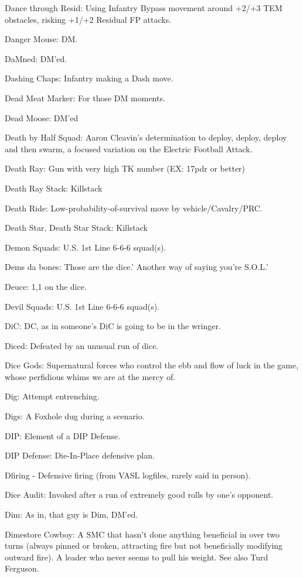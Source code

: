 \documentclass[letterpaper]{article}
\begin{document}
Dance through Resid: Using Infantry Bypass movement around +2/+3 TEM obstacles, risking +1/+2 Residual FP attacks.

Danger Mouse: DM.

DaMned: DM'ed.

Dashing Chaps: Infantry making a Dash move.

Dead Meat Marker: For those DM moments.

Dead Moose: DM'ed

Death by Half Squad: Aaron Cleavin's determination to deploy, deploy, deploy and then swarm, a focused variation on the Electric Football Attack.

Death Ray: Gun with very high TK number (EX: 17pdr or better)

Death Ray Stack: Killstack

Death Ride: Low-probability-of-survival move by vehicle/Cavalry/PRC.

Death Star, Death Star Stack: Killstack

Demon Squads: U.S. 1st Line 6-6-6 squad(s).

Dems da bones: Those are the dice.' Another way of saying you're S.O.L.'

Deuce: 1,1 on the dice.

Devil Squads: U.S. 1st Line 6-6-6 squad(s).

DiC: DC, as in someone's DiC is going to be in the wringer.

Diced: Defeated by an unusual run of dice.

Dice Gods: Supernatural forces who control the ebb and flow of luck in the game, whose perfidious whims we are at the mercy of.

Dig: Attempt entrenching.

Digs: A Foxhole dug during a scenario.

DIP: Element of a DIP Defense.

DIP Defense: Die-In-Place defensive plan.

Dfiring - Defensive firing (from VASL logfiles, rarely said in person).

Dice Audit: Invoked after a run of extremely good rolls by one's opponent.

Dim: As in, that guy is Dim, DM'ed.

Dimestore Cowboy: A SMC that hasn't done anything beneficial in over two turns (always pinned or broken, attracting fire but not beneficially modifying outward fire). A leader who never seems to pull his weight. See also Turd Ferguson.
\end{document}
